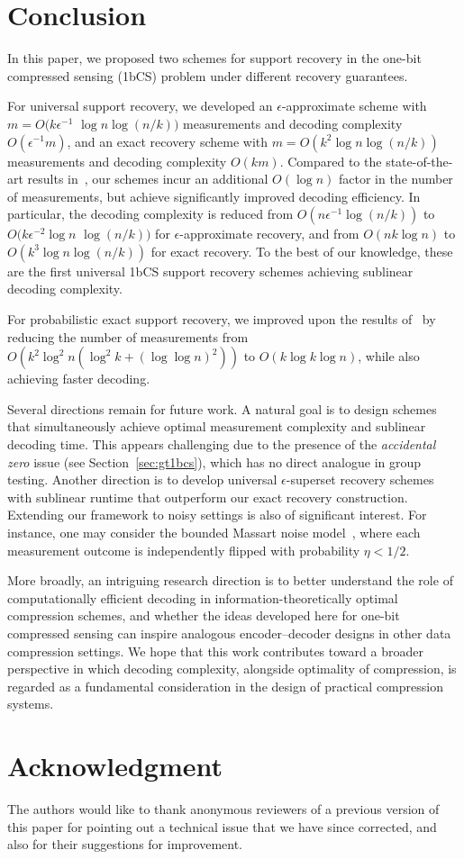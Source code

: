 \documentclass{article}
\begin{document}
\section{Conclusion}\label{sec:sum}
In this paper, we proposed two schemes for support recovery in the one-bit compressed sensing (1bCS) problem under different recovery guarantees. 

For universal support recovery, we developed an $\epsilon$-approximate scheme with
$m=O(k\epsilon^{-1}$ $\log n\log(n/k))$ measurements and decoding complexity $O(\epsilon^{-1}m)$, and an exact recovery scheme with $m=O(k^2\log n\log (n/k))$ measurements and decoding complexity $O(km)$. Compared to the state-of-the-art results in~\cite{acharya2017improved,matsumoto2023improved}, our schemes incur an additional $O(\log n)$ factor in the number of measurements, but achieve significantly improved decoding efficiency. In particular, the decoding complexity is reduced from $O(n\epsilon^{-1}\log(n/k))$ to $O(k\epsilon^{-2}\log n$ $\log(n/k))$ for $\epsilon$-approximate recovery, and from $O(nk\log n)$ to $O(k^3\log n\log(n/k))$ for exact recovery. To the best of our knowledge, these are the first universal 1bCS support recovery schemes achieving sublinear decoding complexity.

For probabilistic exact support recovery, we improved upon the results of~\cite{yang2025sublinear} by reducing the number of measurements from $O(k^2\log^2 n(\log^2 k+(\log\log n)^2))$ to $O\!\left(k\log k\log n\right)$, while also achieving faster decoding.

Several directions remain for future work. A natural goal is to design schemes that simultaneously achieve optimal measurement complexity and sublinear decoding time. This appears challenging due to the presence of the \emph{accidental zero} issue (see Section~\ref{sec:gt1bcs}), which has no direct analogue in group testing. Another direction is to develop universal $\epsilon$-superset recovery schemes~\cite{matsumoto2023improved} with sublinear runtime that outperform our exact recovery construction. Extending our framework to noisy settings is also of significant interest. For instance, one may consider the bounded Massart noise model~\cite{awasthi2016learning}, where each measurement outcome is independently flipped with probability $\eta < 1/2$. 

More broadly, an intriguing research direction is to better understand the role of computationally efficient decoding in information-theoretically optimal  compression schemes, and whether the ideas developed here for one-bit compressed sensing can inspire analogous encoder--decoder designs in other data compression settings. We hope that this work contributes toward a broader perspective in which decoding complexity, alongside optimality of compression, is regarded as a fundamental consideration in the design of practical compression systems.

\section*{Acknowledgment}
The authors would like to thank %
anonymous reviewers of a previous version of this paper for pointing out a technical issue that we have since corrected, and also for their suggestions for improvement. 



\end{document}
